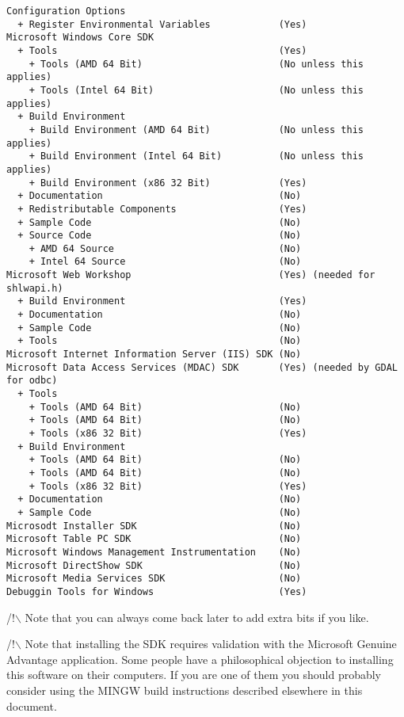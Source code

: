 \begin{verbatim}
Configuration Options
  + Register Environmental Variables            (Yes)
Microsoft Windows Core SDK
  + Tools                                       (Yes)
    + Tools (AMD 64 Bit)                        (No unless this applies)
    + Tools (Intel 64 Bit)                      (No unless this applies)
  + Build Environment
    + Build Environment (AMD 64 Bit)            (No unless this applies)
    + Build Environment (Intel 64 Bit)          (No unless this applies)
    + Build Environment (x86 32 Bit)            (Yes)
  + Documentation                               (No)
  + Redistributable Components                  (Yes)
  + Sample Code                                 (No)
  + Source Code                                 (No)
    + AMD 64 Source                             (No)
    + Intel 64 Source                           (No)
Microsoft Web Workshop                          (Yes) (needed for shlwapi.h)
  + Build Environment                           (Yes)
  + Documentation                               (No)
  + Sample Code                                 (No)
  + Tools                                       (No)
Microsoft Internet Information Server (IIS) SDK (No)
Microsoft Data Access Services (MDAC) SDK       (Yes) (needed by GDAL for odbc)
  + Tools
    + Tools (AMD 64 Bit)                        (No)
    + Tools (AMD 64 Bit)                        (No)
    + Tools (x86 32 Bit)                        (Yes)
  + Build Environment
    + Tools (AMD 64 Bit)                        (No)
    + Tools (AMD 64 Bit)                        (No)
    + Tools (x86 32 Bit)                        (Yes)
  + Documentation                               (No)
  + Sample Code                                 (No)
Microsodt Installer SDK                         (No)
Microsoft Table PC SDK                          (No)
Microsoft Windows Management Instrumentation    (No)
Microsoft DirectShow SDK                        (No)
Microsoft Media Services SDK                    (No)
Debuggin Tools for Windows                      (Yes)
\end{verbatim}

/!$\backslash$ Note that you can always come back later to add extra bits if you like.

/!$\backslash$ Note that installing the SDK requires validation with the 
Microsoft Genuine Advantage application. Some people have a philosophical 
objection to installing this software on their computers. If you are one 
of them you should probably consider using the MINGW build instructions 
described elsewhere in this document.

